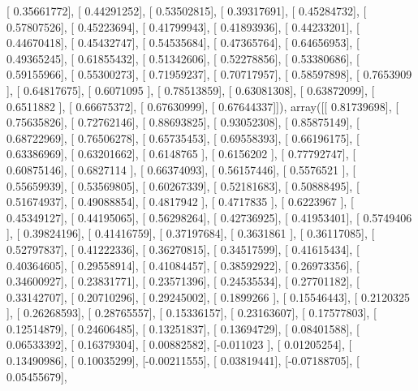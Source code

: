 \documentclass{article}
\begin{document}
       [ 0.35661772],
       [ 0.44291252],
       [ 0.53502815],
       [ 0.39317691],
       [ 0.45284732],
       [ 0.57807526],
       [ 0.45223694],
       [ 0.41799943],
       [ 0.41893936],
       [ 0.44233201],
       [ 0.44670418],
       [ 0.45432747],
       [ 0.54535684],
       [ 0.47365764],
       [ 0.64656953],
       [ 0.49365245],
       [ 0.61855432],
       [ 0.51342606],
       [ 0.52278856],
       [ 0.53380686],
       [ 0.59155966],
       [ 0.55300273],
       [ 0.71959237],
       [ 0.70717957],
       [ 0.58597898],
       [ 0.7653909 ],
       [ 0.64817675],
       [ 0.6071095 ],
       [ 0.78513859],
       [ 0.63081308],
       [ 0.63872099],
       [ 0.6511882 ],
       [ 0.66675372],
       [ 0.67630999],
       [ 0.67644337]]), array([[ 0.81739698],
       [ 0.75635826],
       [ 0.72762146],
       [ 0.88693825],
       [ 0.93052308],
       [ 0.85875149],
       [ 0.68722969],
       [ 0.76506278],
       [ 0.65735453],
       [ 0.69558393],
       [ 0.66196175],
       [ 0.63386969],
       [ 0.63201662],
       [ 0.6148765 ],
       [ 0.6156202 ],
       [ 0.77792747],
       [ 0.60875146],
       [ 0.6827114 ],
       [ 0.66374093],
       [ 0.56157446],
       [ 0.5576521 ],
       [ 0.55659939],
       [ 0.53569805],
       [ 0.60267339],
       [ 0.52181683],
       [ 0.50888495],
       [ 0.51674937],
       [ 0.49088854],
       [ 0.4817942 ],
       [ 0.4717835 ],
       [ 0.6223967 ],
       [ 0.45349127],
       [ 0.44195065],
       [ 0.56298264],
       [ 0.42736925],
       [ 0.41953401],
       [ 0.5749406 ],
       [ 0.39824196],
       [ 0.41416759],
       [ 0.37197684],
       [ 0.3631861 ],
       [ 0.36117085],
       [ 0.52797837],
       [ 0.41222336],
       [ 0.36270815],
       [ 0.34517599],
       [ 0.41615434],
       [ 0.40364605],
       [ 0.29558914],
       [ 0.41084457],
       [ 0.38592922],
       [ 0.26973356],
       [ 0.34600927],
       [ 0.23831771],
       [ 0.23571396],
       [ 0.24535534],
       [ 0.27701182],
       [ 0.33142707],
       [ 0.20710296],
       [ 0.29245002],
       [ 0.1899266 ],
       [ 0.15546443],
       [ 0.2120325 ],
       [ 0.26268593],
       [ 0.28765557],
       [ 0.15336157],
       [ 0.23163607],
       [ 0.17577803],
       [ 0.12514879],
       [ 0.24606485],
       [ 0.13251837],
       [ 0.13694729],
       [ 0.08401588],
       [ 0.06533392],
       [ 0.16379304],
       [ 0.00882582],
       [-0.011023  ],
       [ 0.01205254],
       [ 0.13490986],
       [ 0.10035299],
       [-0.00211555],
       [ 0.03819441],
       [-0.07188705],
       [ 0.05455679],
\end{document}
